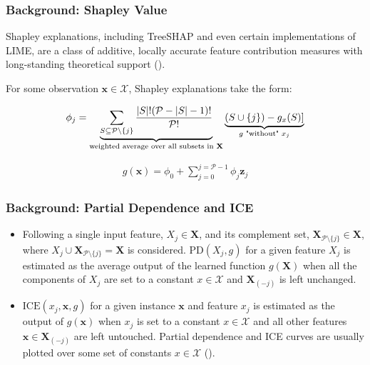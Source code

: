 \documentclass[11pt,aspectratio=169,hyperref={colorlinks}]{beamer}
\begin{document}
\begin{frame}[allowframebreaks]
		\end{frame}

		\begin{frame}
		
			\frametitle{Background: Shapley Value}	
			
			Shapley explanations, including TreeSHAP and even certain implementations of LIME, are a class of additive, locally accurate feature contribution measures with long-standing theoretical support (\cite{shapley}). 

			\vspace{8pt}
			
			For some observation $\mathbf{x} \in \mathcal{X}$, Shapley explanations take the form:
			
			\begin{equation}
				\label{eq:shap_contrib}
				\begin{aligned}
					\phi_{j} = \underbrace{\sum_{S \subseteq \mathcal{P} \setminus \{j\}}\frac{|S|!(\mathcal{P} -|S| -1)!}{\mathcal{P}!}}_\text{weighted average over all subsets in \textbf{X}}\underbrace{(S \cup \{j\}) - g_x(S)]}_{g\text{ "without" }x_j}
				\end{aligned}
			\end{equation}
			
			\begin{equation}
				\label{eq:shap_additive}
				\begin{aligned}
					g(\mathbf{x}) = \phi_0 + \sum_{j=0}^{j=\mathcal{P} - 1} \phi_j \mathbf{z}_j
				\end{aligned}
			\end{equation}
			
		\end{frame}
		
		\begin{frame}
		
			\frametitle{Background: Partial Dependence and ICE}			

			\begin{itemize}

			\item Following \citet{esl} a single input feature, $X_j \in \mathbf{X}$, and its complement set, $\mathbf{X}_{\mathcal{P} \setminus \{j\}} \in \mathbf{X}$, where $X_j \cup \mathbf{X}_{\mathcal{P} \setminus \{j\}} = \mathbf{X}$ is considered. $\text{PD}(X_j, g)$ for a given feature $X_j$ is estimated as the average output of the learned function $g(\mathbf{X})$ when all the components of $X_j$ are set to a constant $x \in \mathcal{X}$ and $\mathbf{X}_{(-j)}$ is left unchanged.

			\item $\text{ICE}(x_j, \mathbf{x}, g)$ for a given instance $\mathbf{x}$ and feature $x_j$ is estimated as the output of $g(\mathbf{x})$ when $x_j$ is set to a constant $x \in \mathcal{X}$ and all other features $\mathbf{x} \in \mathbf{X}_{(-j)}$ are left untouched. Partial dependence and ICE curves are usually plotted over some set of constants $x \in \mathcal{X}$ (\cite{ice_plots}). 

			\end{itemize} 			
					
		\end{frame}		
		
\end{document}
